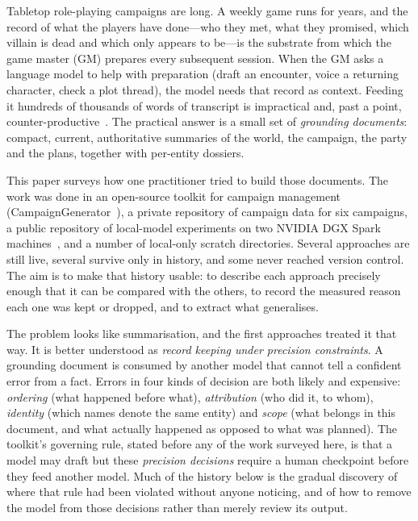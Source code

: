 \documentclass[11pt]{article}
\begin{document}
Tabletop role-playing campaigns are long. A weekly game runs for years, and the record of what the
players have done---who they met, what they promised, which villain is dead and which only appears to
be---is the substrate from which the game master (GM) prepares every subsequent session. When the GM
asks a language model to help with preparation (draft an encounter, voice a returning character,
check a plot thread), the model needs that record as context. Feeding it hundreds of thousands of
words of transcript is impractical and, past a point, counter-productive~\cite{liu2024lost}. The
practical answer is a small set of \emph{grounding documents}: compact, current, authoritative
summaries of the world, the campaign, the party and the plans, together with per-entity dossiers.

This paper surveys how one practitioner tried to build those documents. The work was done in an
open-source toolkit for campaign management (CampaignGenerator~\cite{campaigngen}), a private
repository of campaign data for six campaigns, a public repository of local-model experiments on two
NVIDIA DGX Spark machines~\cite{dgxfun}, and a number of local-only scratch directories. Several
approaches are still live, several survive only in history, and some never reached version control.
The aim is to make that history usable: to describe each approach precisely enough that it can be
compared with the others, to record the measured reason each one was kept or dropped, and to extract
what generalises.

The problem looks like summarisation, and the first approaches treated it that way. It is better
understood as \emph{record keeping under precision constraints}. A grounding document is consumed by
another model that cannot tell a confident error from a fact. Errors in four kinds of decision are
both likely and expensive: \emph{ordering} (what happened before what), \emph{attribution} (who did
it, to whom), \emph{identity} (which names denote the same entity) and \emph{scope} (what belongs in
this document, and what actually happened as opposed to what was planned). The toolkit's governing
rule, stated before any of the work surveyed here, is that a model may draft but these
\emph{precision decisions} require a human checkpoint before they feed another model. Much of the
history below is the gradual discovery of where that rule had been violated without anyone noticing,
and of how to remove the model from those decisions rather than merely review its output.
\end{document}
